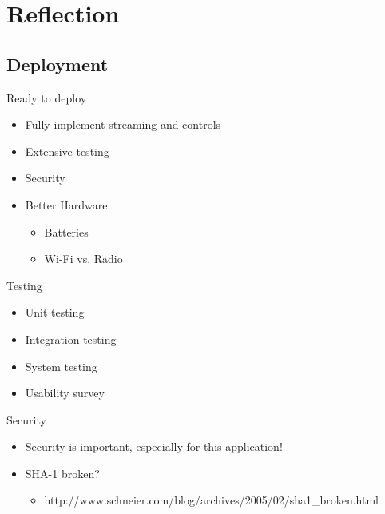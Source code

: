 

\author{Rasmus Steiniche}
\section{Reflection}

\subsection{Deployment}
\begin{frame}{Ready to deploy}
\begin{itemize}
	\item Fully implement streaming and controls
	\item Extensive testing
	\item Security
	\item Better Hardware
	\begin{itemize}
		\item Batteries
		\item Wi-Fi vs. Radio
	\end{itemize}
\end{itemize}
\end{frame}

\begin{frame}{Testing}
\begin{itemize}
	\item Unit testing
	\item Integration testing
	\item System testing
	\item Usability survey
\end{itemize}
\end{frame}

\begin{frame}{Security}
\begin{itemize}
	\item Security is important, especially for this application!
	\item SHA-1 broken?
	\begin{itemize}
		\item http://www.schneier.com/blog/archives/2005/02/sha1_broken.html
	\end{itemize}
\end{itemize}
\end{frame}

